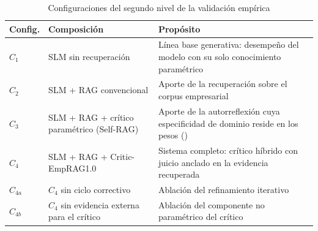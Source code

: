 \begin{table}[H]
\caption{Configuraciones del segundo nivel de la validación empírica}
\label{tab:configuraciones}
\renewcommand{\arraystretch}{1.3}
\small
\begin{tabularx}{\textwidth}{|L{1.3cm}|L{4.6cm}|Y|}
\hline
{}
\textbf{Config.} & \textbf{Composición} & \textbf{Propósito} \\
\hline
$C_1$ & SLM sin recuperación & Línea base generativa: desempeño del modelo con su solo conocimiento paramétrico \\
\hline
$C_2$ & SLM + RAG convencional & Aporte de la recuperación sobre el corpus empresarial \\
\hline
$C_3$ & SLM + RAG + crítico paramétrico (Self-RAG) & Aporte de la autorreflexión cuya especificidad de dominio reside en los pesos (\cite{Asai2024_Selfrag}) \\
\hline
$C_4$ & SLM + RAG + Critic-EmpRAG1.0 & Sistema completo: crítico híbrido con juicio anclado en la evidencia recuperada \\
\hline
$C_{4a}$ & $C_4$ sin ciclo correctivo & Ablación del refinamiento iterativo \\
\hline
$C_{4b}$ & $C_4$ sin evidencia externa para el crítico & Ablación del componente no paramétrico del crítico \\
\hline
\end{tabularx}

\vspace{0.2cm}
\end{table}
